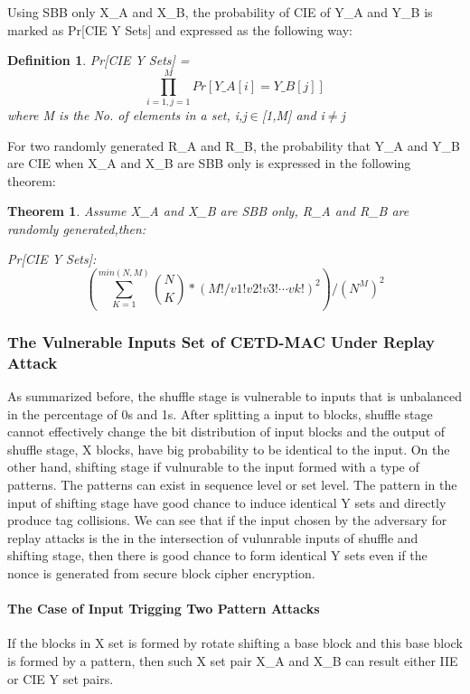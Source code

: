 \documentclass{article}
\newtheorem{theorem}{Theorem}[section]
\newtheorem{defination}{Definition}[section]
\begin{document}
Using SBB only X\_A and X\_B, the probability of CIE of Y\_A and Y\_B is marked as Pr[CIE Y Sets] and expressed as the following way:
\begin{defination}
Pr[CIE Y Sets] = $$\prod_{i=1,j=1}^M Pr[Y\_A[i] = Y\_B[j]]$$ where M is the No. of elements in a set, i,j$\in$[1,M] and i$\neq$j
\end{defination} 

For two randomly generated R\_A and R\_B, the probability that Y\_A and Y\_B are CIE when X\_A and X\_B are SBB only is expressed in the following theorem:
\begin{theorem}
Assume X\_A and X\_B are SBB only, R\_A and R\_B are randomly generated,then:

Pr[CIE Y Sets]:
\begin{displaymath}
(\sum_{K=1}^{min(N,M)} \binom{N}{K} * (M!/v1!v2!v3! \cdots vk!) ^ 2 )/(N^M)^2
\end{displaymath}
\label{set-prob}
\end{theorem}

\subsubsection{The Vulnerable Inputs Set of CETD-MAC Under Replay Attack}
As summarized before, the shuffle stage is vulnerable to inputs that is unbalanced in the percentage of 0s and 1s. After splitting a input to blocks, shuffle stage cannot effectively change the bit distribution of input blocks and the output of shuffle stage, X blocks, have big probability to be identical to the input.
On the other hand, shifting stage if vulnurable to the input formed with a type of patterns. The patterns can exist in sequence level or set level. The pattern in the input of shifting stage have good chance to induce identical Y sets and directly produce tag collisions. 
We can see that if the input chosen by the adversary for replay attacks is the in the intersection of vulunrable inputs of shuffle and shifting stage, then there is good chance to form identical Y sets even if the nonce is generated from secure block cipher encryption. 

\paragraph{The Case of Input Trigging Two Pattern Attacks}
If the blocks in X set is formed by rotate shifting a base block and this base block is formed by a pattern, then such X set pair X\_A and X\_B can result either IIE or CIE Y set pairs.
\end{document}
